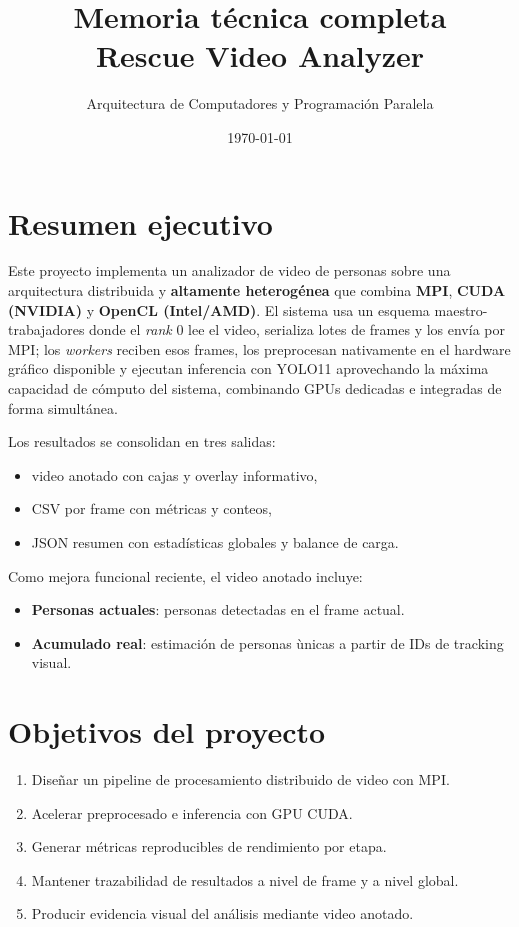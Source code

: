 \documentclass[11pt,a4paper]{article}
\title{Memoria t\'ecnica completa\\Rescue Video Analyzer}
\author{Arquitectura de Computadores y Programaci\'on Paralela}
\date{\today}
\begin{document}
\maketitle
\tableofcontents
\newpage

\section{Resumen ejecutivo}
Este proyecto implementa un analizador de video de personas sobre una arquitectura distribuida y \textbf{altamente heterog\'enea} que combina \textbf{MPI}, \textbf{CUDA (NVIDIA)} y \textbf{OpenCL (Intel/AMD)}. El sistema usa un esquema maestro-trabajadores donde el \emph{rank} 0 lee el video, serializa lotes de frames y los env\'ia por MPI; los \emph{workers} reciben esos frames, los preprocesan nativamente en el hardware gr\'afico disponible y ejecutan inferencia con YOLO11 aprovechando la m\'axima capacidad de c\'omputo del sistema, combinando GPUs dedicadas e integradas de forma simult\'anea.

Los resultados se consolidan en tres salidas:
\begin{itemize}[leftmargin=*]
  \item video anotado con cajas y overlay informativo,
  \item CSV por frame con m\'etricas y conteos,
  \item JSON resumen con estad\'isticas globales y balance de carga.
\end{itemize}

Como mejora funcional reciente, el video anotado incluye:
\begin{itemize}[leftmargin=*]
  \item \textbf{Personas actuales}: personas detectadas en el frame actual.
  \item \textbf{Acumulado real}: estimaci\'on de personas \`unicas a partir de IDs de tracking visual.
\end{itemize}

\section{Objetivos del proyecto}
\begin{enumerate}[leftmargin=*]
  \item Dise\~nar un pipeline de procesamiento distribuido de video con MPI.
  \item Acelerar preprocesado e inferencia con GPU CUDA.
  \item Generar m\'etricas reproducibles de rendimiento por etapa.
  \item Mantener trazabilidad de resultados a nivel de frame y a nivel global.
  \item Producir evidencia visual del an\'alisis mediante video anotado.
\end{enumerate}
\end{document}
